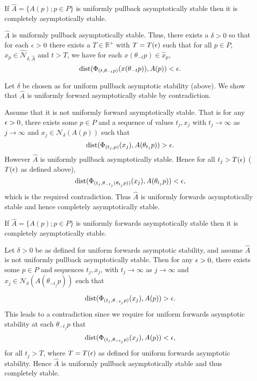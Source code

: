 \begin{lemma}
\label{upascaslem}
If $\hat{A} = \{A(p) ; p \in P \}$ is uniformly pullback asymptotically stable
then it is completely asymptotically stable.
\end{lemma}
\begin{prf}
$\hat{A}$ is uniformly pullback asymptotically stable. Thus, there exists a
$\delta > 0$ so that for each $\epsilon > 0$ there exists a $T \in \mathbb{R}^+$ with
$T = T(\epsilon)$ such that for all $p \in P$, $\hat{x}_p \in
\hat{\mathcal{N}}_{\delta, \hat{A}}$ and $t > T$, we have for each $x(\theta_{-t}p) \in \hat{x}_p$,
\[ {\rm dist}( \Phi_{(t, \theta_{-t}p)}(x(\theta_{-t}p)), A(p) ) < \epsilon. \]

Let $\delta$ be chosen as for uniform pullback asymptotic stability (above).
We show that $\hat{A}$ is uniformly forward asymptotically stable by
contradiction.

Assume that it is not uniformly forward asymptotically stable. That is for any
$\epsilon > 0$, there exists some $p \in P$ and a sequence of values $t_j, x_j$ with
$t_j \to \infty$ as $j \to \infty$ and $x_j \in \mathcal{N}_{\delta}(A(p))$ such
that
\[ {\rm dist}( \Phi_{(t_j, p)}(x_j), A(\theta_{t_j}p)) > \epsilon. \]
However $\hat{A}$ is uniformly pullback asymptotically stable. Hence for all
$t_j > T( \epsilon )$ ($T(\epsilon)$ as defined above),
\[ {\rm dist}(\Phi_{(t_j, \theta_{-t_j}(\theta_{t_j}p))}(x_j), A(\theta_{t_j}p)) <
\epsilon, \]
which is the required contradiction. Thus $\hat{A}$ is uniformly forwards
asymptotically stable and hence completely asymptotically stable.
\end{prf}

\begin{lemma}
\label{ufascaslem}
If $\hat{A} = \{A(p) ; p \in P \}$ is uniformly forwards asymptotically stable
then it is completely asymptotically stable.
\end{lemma}
\begin{prf}
Let $\delta > 0$ be as defined for uniform forwards asymptotic stability, and
assume $\hat{A}$ is not uniformly pullback asymptotically stable.
Then for any $\epsilon > 0$, there exists some $p \in P$ and sequences $t_j, x_j$,
with $t_j \to \infty$ as $j \to \infty$ and $x_j \in
\mathcal{N}_{\delta}(A(\theta_{-t_j}p))$ such that

\[ {\rm dist}( \Phi_{(t_j, \theta_{-t_j}p)}(x_j), A(p) ) > \epsilon. \]
This leads to a contradiction since we require for uniform forwards asymptotic
stability at each $\theta_{-t_j}p$ that
\[ {\rm dist}(\Phi_{(t_j, \theta_{-t_j}p)}(x_j), A(p) ) < \epsilon, \]
for all $t_j > T$, where $T = T( \epsilon )$ as defined for uniform forwards
asymptotic stability. Hence $\hat{A}$ is uniformly pullback asymptotically
stable and thus completely stable.
\end{prf}

